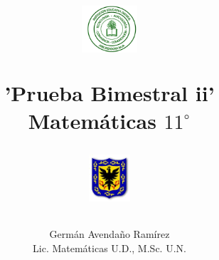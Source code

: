 \documentclass[10pt,letterpaper,addpoints]{exam}
\begin{document}
\title{\begin{minipage}{.2\textwidth}
        \includegraphics[height=1.75cm]{Images/logo-colegio.png}
       \end{minipage}
\begin{minipage}{.55\textwidth}
 \begin{center}
'Prueba Bimestral ii'\\Matem\'{a}ticas $11^{\circ}$
\end{center}
\end{minipage}
\begin{minipage}{.2\textwidth}
\includegraphics[height=1.75cm]{Images/logo-sed.png} 
\end{minipage}
}
\author{Germ\'{a}n Avendaño Ram\'{i}rez\\Lic. Matemáticas U.D., M.Sc. U.N.}
\date{}
\maketitle
\begin{center}
\end{center}
\vspace{0.1in}
\end{document}
